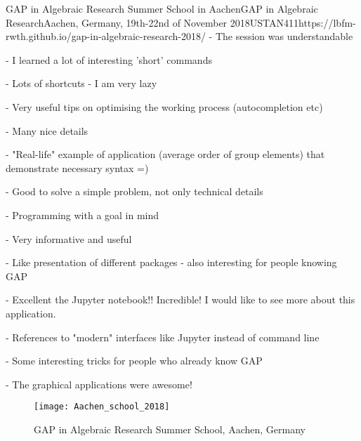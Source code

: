 \begin{event}{GAP in Algebraic Research Summer School in Aachen}{GAP in Algebraic Research}{Aachen, Germany, 19th-22nd of November 2018}{USTAN}{41}{1}{https://lbfm-rwth.github.io/gap-in-algebraic-research-2018/}
- The session was understandable

- I learned a lot of interesting 'short' commands

- Lots of shortcuts - I am very lazy

- Very useful tips on optimising the working process (autocompletion etc)

- Many nice details

- "Real-life" example of application (average order of group elements) that demonstrate necessary syntax =)

- Good to solve a simple problem, not only technical details

- Programming with a goal in mind

- Very informative and useful

- Like presentation of different packages - also interesting for people knowing GAP

- Excellent the Jupyter notebook!! Incredible! I would like to see more about this application.

- References to "modern" interfaces like Jupyter instead of command line

- Some interesting tricks for people who already know GAP

- The graphical applications were awesome!

\begin{figure}[ht]
  \texttt{[image: Aachen\_school\_2018]}
  \caption*{GAP in Algebraic Research Summer School, Aachen, Germany}
\end{figure}

\end{event}
